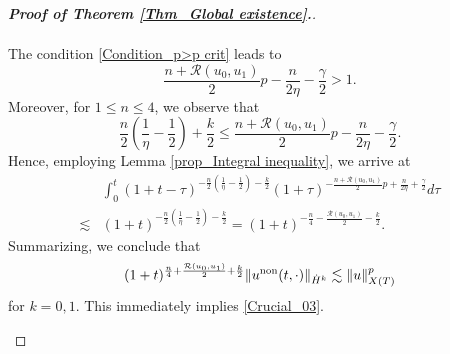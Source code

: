 \documentclass[11pt,reqno]{amsart}
\begin{document}
\begin{proof}[\textbf{Proof of Theorem \ref{Thm_Global existence}.}]
\begin{itemize}
\begin{align*}
\end{align*}
The condition \eqref{Condition_p>p crit} leads to $$\frac{n+\mathcal{R}(u_0, u_1)}{2}p-\frac{n}{2\eta}-\frac{\gamma}{2} > 1.$$ Moreover, for $1 \leq n \leq 4$, we observe that 
$$
\frac{n}{2}\left(\frac{1}{\eta}-\frac{1}{2}\right)+\frac{k}{2}\leq \frac{n+\mathcal{R}(u_0, u_1)}{2}p-\frac{n}{2\eta}-\frac{\gamma}{2}.
$$
Hence, employing Lemma \ref{prop_Integral inequality},  we arrive at 
\begin{align*}
&\int_0^t(1+t-\tau)^{-\frac{n}{2}(\frac{1}{\eta}-\frac{1}{2})-\frac{k}{2}}(1+\tau)^{-\frac{n+\mathcal{R}(u_0, u_1)}{2}p+\frac{n}{2\eta}+\frac{\gamma}{2}}d\tau \\
\lesssim & (1+t)^{-\frac{n}{2}(\frac{1}{\eta}-\frac{1}{2})-\frac{k}{2}} = (1+t)^{-\frac{n}{4}-\frac{\mathcal{R}(u_0, u_1)}{2}-\frac{k}{2}}.
\end{align*}
Summarizing, we conclude that
\begin{equation*}
(1+t)^{\frac{n}{4}+\frac{\mathcal{R}(u_0, u_1)}{2}+\frac{k}{2}} \|u^{\rm non}(t,\cdot)\|_{\dot{H}^k} \lesssim \|u\|_{X(T)}^p
\end{equation*}
for $k=0,1$.
This immediately implies \eqref{Crucial_03}.


\end{itemize}
\end{proof}
\end{document}
